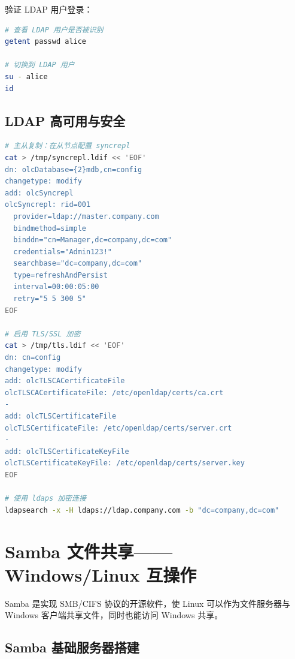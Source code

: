 \documentclass[12pt,UTF8]{ctexbook}
\begin{document}
验证 LDAP 用户登录：

\begin{lstlisting}[language=bash]
# 查看 LDAP 用户是否被识别
getent passwd alice

# 切换到 LDAP 用户
su - alice
id
\end{lstlisting}

\subsection{LDAP 高可用与安全}

\begin{lstlisting}[language=bash]
# 主从复制：在从节点配置 syncrepl
cat > /tmp/syncrepl.ldif << 'EOF'
dn: olcDatabase={2}mdb,cn=config
changetype: modify
add: olcSyncrepl
olcSyncrepl: rid=001
  provider=ldap://master.company.com
  bindmethod=simple
  binddn="cn=Manager,dc=company,dc=com"
  credentials="Admin123!"
  searchbase="dc=company,dc=com"
  type=refreshAndPersist
  interval=00:00:05:00
  retry="5 5 300 5"
EOF

# 启用 TLS/SSL 加密
cat > /tmp/tls.ldif << 'EOF'
dn: cn=config
changetype: modify
add: olcTLSCACertificateFile
olcTLSCACertificateFile: /etc/openldap/certs/ca.crt
-
add: olcTLSCertificateFile
olcTLSCertificateFile: /etc/openldap/certs/server.crt
-
add: olcTLSCertificateKeyFile
olcTLSCertificateKeyFile: /etc/openldap/certs/server.key
EOF

# 使用 ldaps 加密连接
ldapsearch -x -H ldaps://ldap.company.com -b "dc=company,dc=com"
\end{lstlisting}

\section{Samba 文件共享——Windows/Linux 互操作}
\label{sec:samba-integration}

Samba 是实现 SMB/CIFS 协议的开源软件，使 Linux 可以作为文件服务器与 Windows 客户端共享文件，同时也能访问 Windows 共享。

\subsection{Samba 基础服务器搭建}
\end{document}
